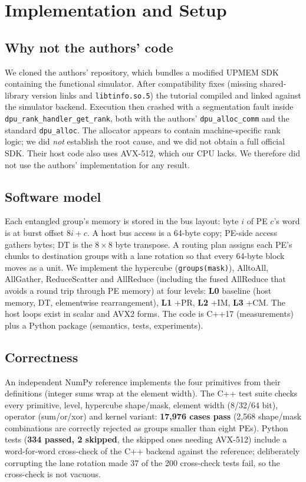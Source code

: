 \documentclass[conference]{IEEEtran}
\begin{document}
\section{Implementation and Setup}
\subsection{Why not the authors' code}
We cloned the authors' repository, which bundles a modified UPMEM SDK containing the functional simulator. After compatibility fixes (missing shared-library version links and \texttt{libtinfo.so.5}) the tutorial compiled and linked against the simulator backend. Execution then crashed with a segmentation fault inside \texttt{dpu\_rank\_handler\_get\_rank}, both with the authors' \texttt{dpu\_alloc\_comm} and the standard \texttt{dpu\_alloc}. The allocator appears to contain machine-specific rank logic; we did \emph{not} establish the root cause, and we did not obtain a full official SDK. Their host code also uses AVX-512, which our CPU lacks. We therefore did not use the authors' implementation for any result.

\subsection{Software model}
Each entangled group's memory is stored in the bus layout: byte $i$ of PE $c$'s word is at burst offset $8i+c$. A host bus access is a 64-byte copy; PE-side access gathers bytes; DT is the $8\times8$ byte transpose. A routing plan assigns each PE's chunks to destination groups with a lane rotation so that every 64-byte block moves as a unit. We implement the hypercube (\texttt{groups(mask)}), AlltoAll, AllGather, ReduceScatter and AllReduce (including the fused AllReduce that avoids a round trip through PE memory) at four levels: \textbf{L0} baseline (host memory, DT, elementwise rearrangement), \textbf{L1} +PR, \textbf{L2} +IM, \textbf{L3} +CM. The host loops exist in scalar and AVX2 forms. The code is C++17 (measurements) plus a Python package (semantics, tests, experiments).

\subsection{Correctness}
An independent NumPy reference implements the four primitives from their definitions (integer sums wrap at the element width). The C++ test suite checks every primitive, level, hypercube shape/mask, element width (8/32/64 bit), operator (sum/or/xor) and kernel variant: \textbf{17,976 cases pass} (2,568 shape/mask combinations are correctly rejected as groups smaller than eight PEs). Python tests (\textbf{334 passed, 2 skipped}, the skipped ones needing AVX-512) include a word-for-word cross-check of the C++ backend against the reference; deliberately corrupting the lane rotation made 37 of the 200 cross-check tests fail, so the cross-check is not vacuous.
\end{document}
